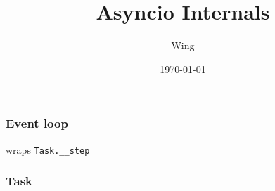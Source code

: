 \documentclass[compress,usenames,dvipsnames]{beamer}
\author{Wing}
\title{Asyncio Internals}
\begin{document}
\date{\today} 

\frame[plain]{\titlepage} %


\begin{frame}
    \frametitle{Event loop}
    \begin{center}
    \begin{adjustbox}{margin=10pt}
         
    \end{adjustbox}
    \end{center}
    {} wraps \verb|Task.__step|
\end{frame}

\begin{frame}[plain, t]
    \frametitle{Task}
    \begin{center}
    \begin{adjustbox}{margin=10pt}
             
    \end{adjustbox}
    \end{center}
\end{frame}

\end{document}
